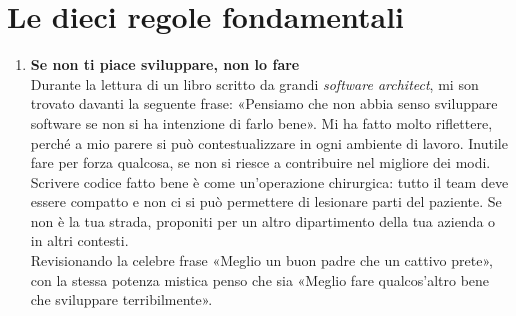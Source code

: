 \section{Le dieci regole fondamentali}

\begin{enumerate}

\item \textbf{Se non ti piace sviluppare, non lo fare} \\
Durante la lettura di un libro scritto da grandi \emph{software architect}, mi son trovato davanti la seguente frase: «Pensiamo che non abbia senso sviluppare software se non si ha intenzione di farlo bene». Mi ha fatto molto riflettere, perché a mio parere si può contestualizzare in ogni ambiente di lavoro. Inutile fare per forza qualcosa, se non si riesce a contribuire nel migliore dei modi. Scrivere codice fatto bene è come un’operazione chirurgica: tutto il team deve essere compatto e non ci si può permettere di lesionare parti del paziente. Se non è la tua strada, proponiti per un altro dipartimento della tua azienda o in altri contesti. \\
Revisionando la celebre frase «Meglio un buon padre che un cattivo prete», con la stessa potenza mistica penso che sia «Meglio fare qualcos’altro bene che sviluppare terribilmente».


\end{enumerate}
